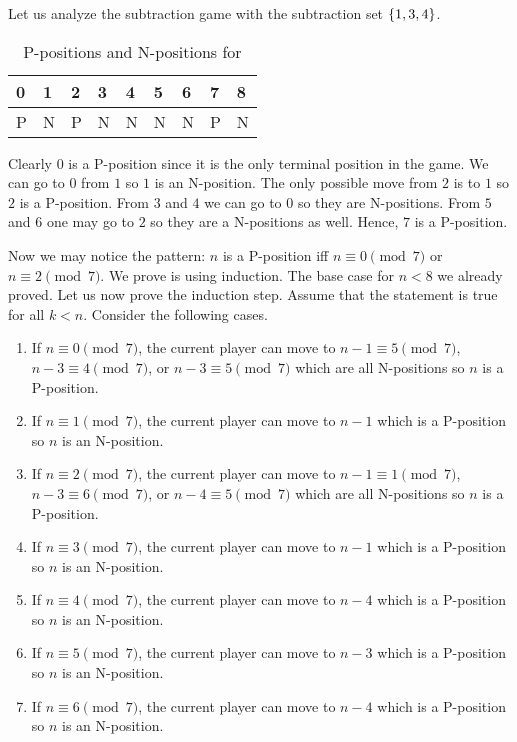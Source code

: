 Let us analyze the subtraction game with the subtraction set $\set{1, 3, 4}$.
\begin{table}[h!]
  \centering
  \begin{tabular}{l l l l l l l l l}
      \toprule
      0 & 1 & 2 & 3 & 4 & 5 & 6 & 7 & 8 \\
      \midrule
      P & N & P & N & N & N & N & P & N \\
      \bottomrule
  \end{tabular}
  \caption{P-positions and N-positions for }
  \label{table:subtraction-4-3-1}
\end{table}
Clearly $0$ is a P-position since it is the only terminal position in the game.
We can go to $0$ from $1$ so $1$ is an N-position. The only possible move from
$2$ is to $1$ so $2$ is a P-position. From $3$ and $4$ we can go to $0$
so they are N-positions. From $5$ and $6$ one may go to $2$ so they are a
N-positions as well. Hence, $7$ is a P-position.

Now we may notice the pattern: $n$ is a P-position iff $n \equiv 0 \pmod{7}$
or $n \equiv 2 \pmod{7}$. We prove is using induction. The base case for $n < 8$
we already proved. Let us now prove the induction step. Assume that the
statement is true for all $k < n$. Consider the following cases.
\begin{enumerate}
  \item If $n \equiv 0 \pmod{7}$, the current player can move to
    $n - 1 \equiv 5 \pmod {7}$, $n - 3 \equiv 4 \pmod {7}$, or
    $n - 3 \equiv 5 \pmod {7}$ which are all N-positions so $n$ is a P-position.
  \item If $n \equiv 1 \pmod{7}$, the current player can move to $n - 1$ which
    is a P-position so $n$ is an N-position.
  \item If $n \equiv 2 \pmod{7}$, the current player can move to
    $n - 1 \equiv 1 \pmod {7}$, $n - 3 \equiv 6 \pmod {7}$, or
    $n - 4 \equiv 5 \pmod {7}$ which are all N-positions so $n$ is a P-position.
  \item If $n \equiv 3 \pmod{7}$, the current player can move to $n - 1$ which
    is a P-position so $n$ is an N-position.
  \item If $n \equiv 4 \pmod{7}$, the current player can move to $n - 4$ which
    is a P-position so $n$ is an N-position.
  \item If $n \equiv 5 \pmod{7}$, the current player can move to $n - 3$ which
    is a P-position so $n$ is an N-position.
  \item If $n \equiv 6 \pmod{7}$, the current player can move to $n - 4$ which
    is a P-position so $n$ is an N-position.
\end{enumerate}


